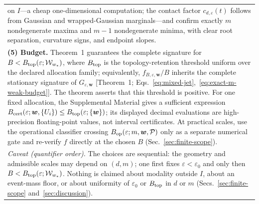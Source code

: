 \begin{table}[!t]
\begin{ruledtabular}
\begin{tabular}{p{}}
on $I$---a cheap one-dimensional computation; the contact factor
$c_{d,\varepsilon}(t)$ follows from Gaussian and wrapped-Gaussian
marginals---and confirm exactly $m$ nondegenerate maxima and $m-1$
nondegenerate minima, with clear root separation, curvature signs, and
endpoint slopes.\\[3pt]
\textbf{(5) Budget.}  Theorem~1 guarantees the complete signature for
$B<B_{\rm top}(\varepsilon;\mathcal W_{w_*})$, where $B_{\rm top}$ is the
topology-retention threshold uniform over the declared allocation
family; equivalently, $f_{B,\varepsilon,\bm w}/B$ inherits the complete
stationary signature
of $G_{\varepsilon,\bm w}$ [Theorem~1;
Eqs.~\eqref{eq:mixed-jet},~\eqref{eq:exact-m-weak-budget}].  The
theorem asserts that this threshold is positive.  For one fixed allocation,
the Supplemental Material gives a sufficient expression
$B_{\rm cert}(\varepsilon;\bm w,\{U_i\})
\le B_{\rm top}(\varepsilon;\{\bm w\})$; its displayed decimal evaluations
are high-precision floating-point values, not interval certificates.  At
practical scales, use the operational classifier crossing
$B_{\rm op}(\varepsilon;m,\bm w,\mathcal P)$ only as a separate numerical
gate and re-verify $f$ directly at the chosen $B$
(Sec.~\ref{sec:finite-scope}).\\[3pt]
\textit{Caveat (quantifier order).}  The choices are sequential: the
geometry and admissible scales may depend on $(d,m)$; one first fixes
$\varepsilon<\varepsilon_0$ and only then
$B<B_{\rm top}(\varepsilon;\mathcal W_{w_*})$.  Nothing
is claimed about modality outside $I$, about an event-mass floor, or
about uniformity of $\varepsilon_0$ or $B_{\rm top}$ in $d$ or $m$
(Secs.~\ref{sec:finite-scope} and~\ref{sec:discussion}).\\
\end{tabular}
\end{ruledtabular}
\end{table}
